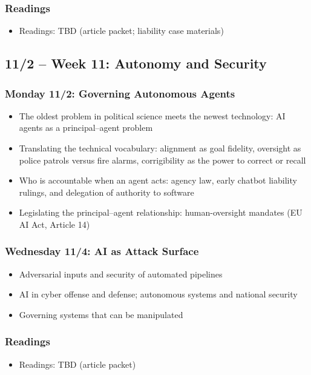 \documentclass[12pt]{article}
\begin{document}
    \subsubsection*{Readings}
        \begin{itemize}
            \item Readings: TBD (article packet; liability case materials)
        \end{itemize}

\subsection*{11/2 -- Week 11: Autonomy and Security}
    \subsubsection*{Monday 11/2: Governing Autonomous Agents}
        \begin{itemize}
            \item The oldest problem in political science meets the newest technology: AI agents as a principal--agent problem
            \item Translating the technical vocabulary: alignment as goal fidelity, oversight as police patrols versus fire alarms, corrigibility as the power to correct or recall
            \item Who is accountable when an agent acts: agency law, early chatbot liability rulings, and delegation of authority to software
            \item Legislating the principal--agent relationship: human-oversight mandates (EU AI Act, Article 14)
        \end{itemize}
    \subsubsection*{Wednesday 11/4: AI as Attack Surface}
        \begin{itemize}
            \item Adversarial inputs and security of automated pipelines
            \item AI in cyber offense and defense; autonomous systems and national security
            \item Governing systems that can be manipulated
        \end{itemize}
    \subsubsection*{Readings}
        \begin{itemize}
            \item Readings: TBD (article packet)
        \end{itemize}
\end{document}
